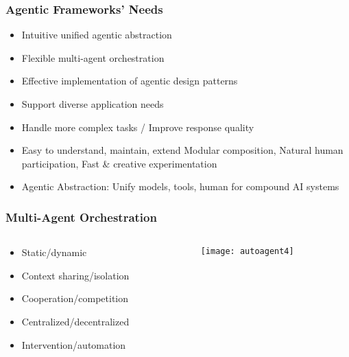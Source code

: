 \begin{frame}[fragile]\frametitle{Agentic Frameworks' Needs}

  \begin{itemize}
  \item Intuitive unified agentic abstraction
  \item Flexible multi-agent orchestration
  \item Effective implementation of agentic design patterns
  \item Support diverse application needs
    \item  Handle more complex tasks / Improve response quality
	\item Easy to understand, maintain, extend Modular composition, Natural human participation, Fast \& creative experimentation
	  \item Agentic Abstraction: Unify models, tools, human for compound AI systems

  \end{itemize}
\end{frame}

\begin{frame}[fragile]\frametitle{Multi-Agent Orchestration}


\begin{columns}
    \begin{column}[T]{0.6\linewidth}

		  \begin{itemize}
		  \item Static/dynamic
		  \item Context sharing/isolation
		  \item Cooperation/competition
		  \item Centralized/decentralized
		  \item Intervention/automation
		  \end{itemize}

    \end{column}
    \begin{column}[T]{0.4\linewidth}

		\begin{center}
		\texttt{[image: autoagent4]}
		\end{center}
	
    \end{column}
  \end{columns}
  
  

\end{frame}

